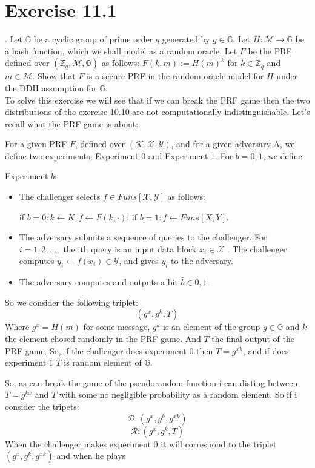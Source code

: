 \documentclass{article}
\begin{document}

\section{Exercise 11.1}
. Let $\mathbb{G}$ be a cyclic group of prime order $q$ generated by $g\in\mathbb{G}$.
Let $H : \mathcal{M}\rightarrow\mathbb{G}$ be a hash function, which we shall model as a random oracle.
Let $F$ be the PRF defined over $(\mathbb{Z}_{q},\mathcal{M},\mathbb{G})$ as follows:
$F(k,m) := H(m)^{k}$
for $k\in\mathbb{Z}_{q}$ and $m\in\mathcal{M}$.
Show that $F$ is a secure PRF in the random oracle model for $H$ under the DDH assumption for
$\mathbb{G}$.
\\


To solve this exercise we will see that if we can break the PRF game then the two distributions of the exercise 10.10 are not computationally indistinguishable. Let's recall what the PRF game is about:

For a given PRF $F$, defined over $(\mathcal{K}, \mathcal{X} , \mathcal{Y})$, and for a given adversary
A, we define two experiments, Experiment $0$ and Experiment $1$. For $b=0,1$, we define:

Experiment $b$:
\begin{itemize}
\item 
The challenger selects $f \in Funs[\mathcal{X},\mathcal{Y}]$ as follows:

if $b = 0: k\leftarrow K, f\leftarrow F(k, ·)$;
if $b = 1: f\leftarrow Funs[X , Y]$.
\item 
The adversary submits a sequence of queries to the challenger.
For $i = 1, 2,\ldots,$ the ith query is an input data block $x_{i}\in\mathcal{X}$ .
The challenger computes $y_{i}\leftarrow f(x_{i})\in \mathcal{Y}$, and gives $y_{i}$ to the adversary.
\item
The adversary computes and outputs a bit $\hat{b}\in {0,1}$.
\end{itemize}



So we consider the following triplet:
$$
(g^{x},g^{k},T)
$$
Where $g^{x}=H(m)$ for some message, $g^{k}$ is an element of the group $g\in\mathbb{G}$  and $k$ the element chosed randomly in the PRF game. And $T$ the final output of the PRF game. So, if the challenger does experiment $0$ then $T=g^{xk}$, and if does experiment $1$ $T$ is random element of $\mathbb{G}$.

So, as can break the game of the pseudorandom function i can disting between $T=g^{kx}$ and $T$ with some no negligible probability as a random element. So if i consider the tripets:
$$
\mathcal{D}:(g^{x},g^{k},g^{xk})
$$
$$
\mathcal{R}:(g^{x},g^{k},T)
$$
When the challenger makes experiment $0$ it will correspond to the triplet $(g^{x},g^{k},g^{xk})$ and when he plays 
\end{document}
